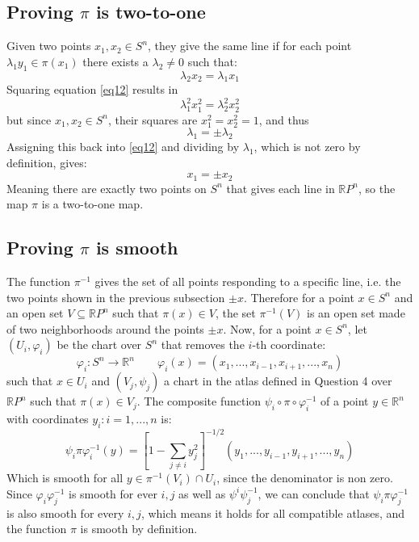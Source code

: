 \documentclass{article}
\newcommand{\R}{\ensuremath{\mathbb{R}}}
\begin{document}
\subsection*{Proving $\pi$ is two-to-one}
Given two points $x_1, x_2 \in S^n$, they give the same line if for each point $\lambda_1 y_1 \in \pi(x_1)$ there exists a $\lambda_2 \ne 0$ such that:
\begin{equation}
    \label{eq12}
    \lambda_2 x_2 = \lambda_1 x_1
\end{equation}
Squaring equation \ref{eq12} results in
\begin{equation}
    \lambda_1^2 x_1^2 = \lambda_2^2 x_2^2
\end{equation}
but since $x_1, x_2 \in S^n$, their squares are $x_1^2 = x_2^2 = 1$, and thus
\begin{equation}
    \label{eq14}
    \lambda_1 = \pm \lambda_2
\end{equation}
Assigning this back into \ref{eq12} and dividing by $\lambda_1$, which is not zero by definition, gives:
\begin{equation}
    x_1 = \pm x_2
\end{equation}
Meaning there are exactly two points on $S^n$ that gives each line in $\R P^n$, so the map $\pi$ is a two-to-one map.
\subsection*{Proving $\pi$ is smooth}
The function $\pi^{-1}$ gives the set of all points responding to a specific line, i.e. the two points shown in the previous subsection $\pm x$. Therefore for a point $x \in S^n$ and an open set $V \subseteq \R P^n$ such that $\pi(x) \in V$, the set $\pi^{-1}(V)$ is an open set made of two neighborhoods around the points $\pm x$.
\newline
Now, for a point $x \in S^n$, let $(U_i, \varphi_i)$ be the chart over $S^n$ that removes the $i$-th coordinate:
\begin{equation}
    \varphi_i : S^n \rightarrow \R^n \qquad \varphi_i(x) = (x_1, ..., x_{i-1}, x_{i+1}, ..., x_n)
\end{equation}
such that $x \in U_i$ and $(V_j, \psi_j)$ a chart in the atlas defined in Question 4 over $\R P^n$ such that $\pi(x) \in V_j$. The composite function $\psi_i \circ \pi \circ \varphi_i^{-1}$ of a point $y \in \R^n$ with coordinates $y_i : i = 1,...,n$ is:
\begin{equation}
    \psi_i \pi \varphi_i^{-1} (y) =
    \left[1 - \sum_{j\ne i} y_j^2\right]^{-1/2}\left(y_1, ..., y_{i-1}, y_{i+1}, ..., y_n\right)
\end{equation}
Which is smooth for all $y \in \pi^{-1}(V_i)\cap U_i$, since the denominator is non zero. Since $\varphi_i \varphi_j^{-1}$ is smooth for ever $i,j$ as well as $\psi^i \psi_j^{-1}$, we can conclude that $\psi_i \pi \varphi_j^{-1}$ is also smooth for every $i, j$, which means it holds for all compatible atlases, and the function $\pi$ is smooth by definition.
\newline
\end{document}
